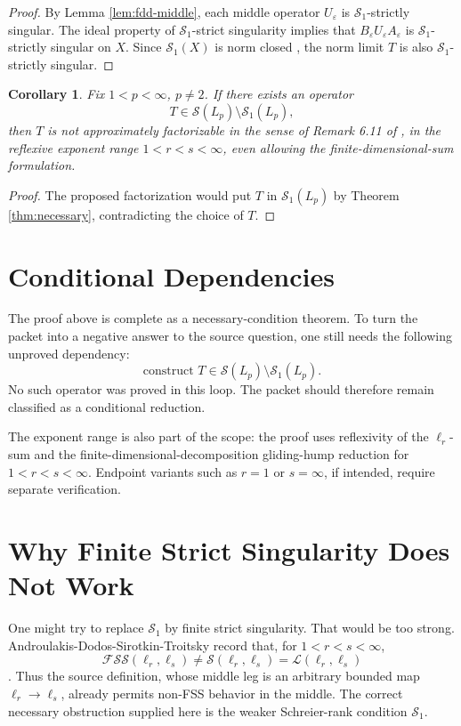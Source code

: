 \documentclass[11pt]{article}
\newtheorem{corollary}{Corollary}
\newcommand{\SSing}{\mathcal S}
\newcommand{\FSS}{\mathcal{FSS}}
\begin{document}
\begin{proof}
By Lemma \ref{lem:fdd-middle}, each middle operator $U_\varepsilon$ is
$\mathcal S_1$-strictly singular.  The ideal property of
$\mathcal S_1$-strict singularity implies that
$B_\varepsilon U_\varepsilon A_\varepsilon$ is $\mathcal S_1$-strictly
singular on $X$.  Since $\mathcal S_1(X)$ is norm closed
\cite[Proposition 2.2]{ADST}, the norm limit $T$ is also
$\mathcal S_1$-strictly singular.
\end{proof}

\begin{corollary}\label{cor:counterexample-reduction}
Fix $1<p<\infty$, $p\ne2$.  If there exists an operator
\[
  T\in \SSing(L_p)\setminus \mathcal S_1(L_p),
\]
then $T$ is not approximately factorizable in the sense of Remark 6.11 of
\cite{MT}, in the reflexive exponent range $1<r<s<\infty$, even allowing the
finite-dimensional-sum formulation.
\end{corollary}

\begin{proof}
The proposed factorization would put $T$ in $\mathcal S_1(L_p)$ by Theorem
\ref{thm:necessary}, contradicting the choice of $T$.
\end{proof}

\section*{Conditional Dependencies}

The proof above is complete as a necessary-condition theorem.  To turn the
packet into a negative answer to the source question, one still needs the
following unproved dependency:
\[
  \text{construct } T\in\SSing(L_p)\setminus\mathcal S_1(L_p).
\]
No such operator was proved in this loop.  The packet should therefore remain
classified as a conditional reduction.

The exponent range is also part of the scope: the proof uses reflexivity of
the $\ell_r$-sum and the finite-dimensional-decomposition gliding-hump
reduction for $1<r<s<\infty$.  Endpoint variants such as $r=1$ or
$s=\infty$, if intended, require separate verification.

\section*{Why Finite Strict Singularity Does Not Work}

One might try to replace $\mathcal S_1$ by finite strict singularity.  That
would be too strong.  Androulakis-Dodos-Sirotkin-Troitsky record that, for
$1<r<s<\infty$,
\[
  \FSS(\ell_r,\ell_s)\ne \SSing(\ell_r,\ell_s)=\mathcal L(\ell_r,\ell_s)
\]
\cite[Example 2.5]{ADST}.  Thus the source definition, whose middle leg is an
arbitrary bounded map $\ell_r\to\ell_s$, already permits non-FSS behavior in
the middle.  The correct necessary obstruction supplied here is the weaker
Schreier-rank condition $\mathcal S_1$.
\end{document}
